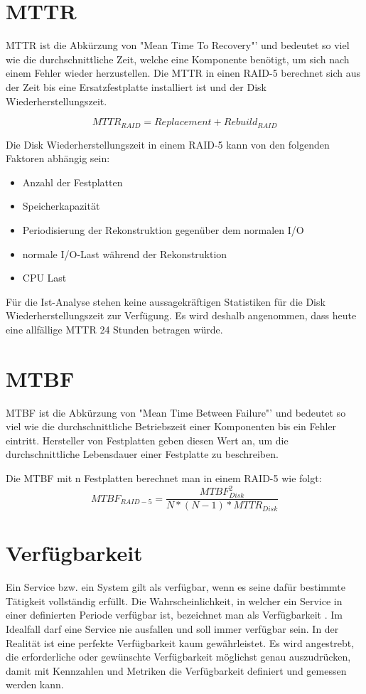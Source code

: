 \section{MTTR}
MTTR  ist die Abkürzung von "Mean Time To Recovery"' und bedeutet so viel wie die durchschnittliche Zeit, welche eine Komponente benötigt, um sich nach einem Fehler wieder herzustellen. Die MTTR in einen RAID-5 berechnet sich aus der Zeit bis eine Ersatzfestplatte installiert ist und der Disk Wiederherstellungszeit. 

\begin{equation}
MTTR_{RAID}=Replacement+Rebuild_{RAID}
\label{eqn:MTTR-RAID-5}
\end{equation}

Die Disk Wiederherstellungszeit in einem RAID-5 kann von den folgenden Faktoren abhängig sein:
\begin{itemize}
\item Anzahl der Festplatten
\item Speicherkapazität
\item Periodisierung der Rekonstruktion gegenüber dem normalen I/O
\item  normale I/O-Last während der Rekonstruktion
\item  CPU Last
\end{itemize}

Für die Ist-Analyse stehen keine aussagekräftigen Statistiken für die Disk Wiederherstellungszeit zur Verfügung. Es wird deshalb angenommen, dass heute eine allfällige MTTR 24 Stunden betragen würde.


\section{MTBF}
MTBF ist die Abkürzung von "Mean Time Between Failure"' und bedeutet so viel wie die durchschnittliche Betriebszeit einer Komponenten bis ein Fehler eintritt. Hersteller von Festplatten geben diesen Wert an, um die durchschnittliche Lebensdauer einer Festplatte zu beschreiben. 

Die MTBF mit n Festplatten berechnet man in einem RAID-5 \cite{Chen1994} wie folgt:
\begin{equation}
MTBF_{RAID-5}=\frac{MTBF_{Disk}^2}{N*(N-1)*MTTR_{Disk}}
\label{eqn:MTBF-RAID-5}
\end{equation}

\section{Verfügbarkeit}
Ein Service bzw. ein System gilt als verfügbar, wenn es seine dafür bestimmte Tätigkeit vollständig erfüllt. Die Wahrscheinlichkeit, in welcher ein Service in einer definierten Periode verfügbar ist, bezeichnet man als Verfügbarkeit \cite{Held2004}. Im Idealfall darf eine Service nie ausfallen und soll immer verfügbar sein. In der Realität ist eine perfekte Verfügbarkeit kaum gewährleistet. Es wird angestrebt, die erforderliche oder gewünschte Verfügbarkeit möglichst genau auszudrücken, damit mit Kennzahlen und Metriken die Verfügbarkeit definiert und gemessen werden kann. 

